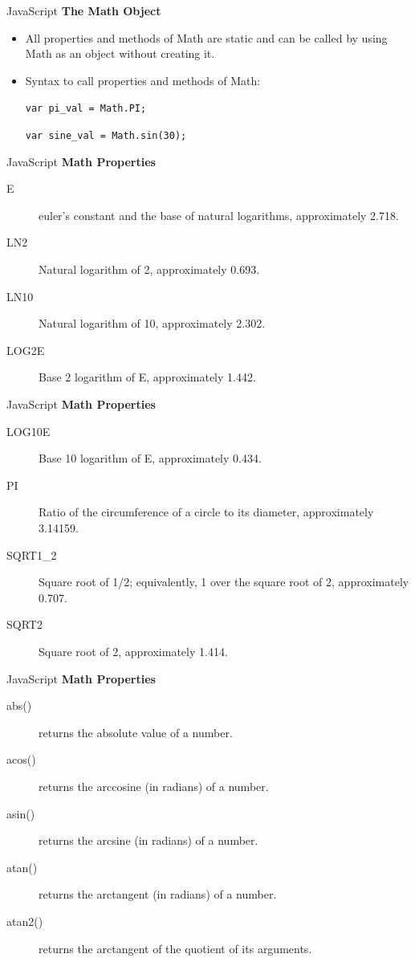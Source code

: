 \documentclass[14pt]{beamer}
\begin{document}
\begin{frame}{JavaScript}
\textbf{The Math Object}
\begin{itemize}
 \item All properties and methods of Math are static and can be called by using Math as an object without creating it.
 \item Syntax to call properties and methods of Math:
  
  \lstinline!var pi_val = Math.PI;!
  
  \lstinline!var sine_val = Math.sin(30);!
\end{itemize}
\end{frame}

\begin{frame}{JavaScript}
\textbf{Math Properties}
\begin{description}
 \item [E] euler's constant and the base of natural logarithms, approximately 2.718.
 \item [LN2] Natural logarithm of 2, approximately 0.693.
 \item [LN10] Natural logarithm of 10, approximately 2.302.
 \item [LOG2E] Base 2 logarithm of E, approximately 1.442.
\end{description}
\end{frame}

\begin{frame}{JavaScript}
\textbf{Math Properties}
\begin{description}
 \item [LOG10E] Base 10 logarithm of E, approximately 0.434.
 \item [PI] Ratio of the circumference of a circle to its diameter, approximately 3.14159.
 \item [SQRT1\_2] Square root of 1/2; equivalently, 1 over the square root of 2, approximately 0.707.
 \item [SQRT2] Square root of 2, approximately 1.414.
\end{description}
\end{frame}


\begin{frame}{JavaScript}
\textbf{Math Properties}
\begin{description}
 \item [abs()] returns the absolute value of a number.
 \item [acos()] returns the arccosine (in radians) of a number.
 \item [asin()] returns the arcsine (in radians) of a number.
 \item [atan()] returns the arctangent (in radians) of a number.
 \item [atan2()] returns the arctangent of the quotient of its arguments.
\end{description}
\end{frame}
\end{document}
